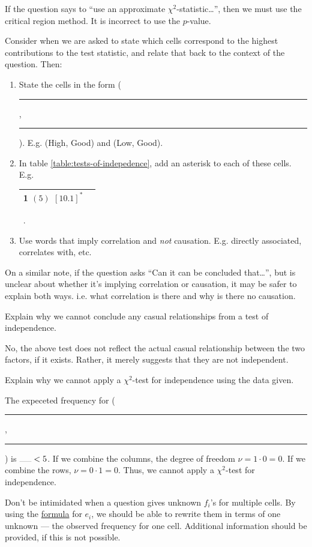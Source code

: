 \documentclass[../Notes.tex]{subfiles}
\begin{document}
\begin{note}
  If the question says to ``use an approximate \(\chi^2\)-statistic\dots'', then we must use the critical region method. It is incorrect to use the \(p\)-value.
\end{note}
\begin{note}
  Consider when we are asked to state which cells correspond to the highest contributions to the test statistic, and relate that back to the context of the question. Then:
  \begin{enumerate}
    \item State the cells in the form (\rule{0.5cm}{0.05mm},\ \rule{0.5cm}{0.05mm}). E.g. (High, Good) and (Low, Good).
    \item In table \ref{table:tests-of-indepedence}, add an asterisk to each of these cells. E.g. 
    \begin{tabular}{|Sc|}
       \((5)\) \([10.1]^{*}\)\\
      \hline
    \end{tabular}\ .
    \item Use words that imply correlation and \emph{not} causation. E.g. directly associated, correlates with, etc.
  \end{enumerate}
\end{note}
\begin{note}
  On a similar note, if the question asks ``Can it can be concluded that\dots'', but is unclear about whether it's implying correlation or causation, it may be safer to explain both ways. i.e. what correlation is there and why is there no causation. 
\end{note}
\begin{note}
  Explain why we cannot conclude any casual relationships from a test of independence.
  \begin{center}
    \parbox{0.9\textwidth}{
      No, the above test does not reflect the actual casual relationship between the two factors, if it exists. Rather, it merely suggests that they are not independent.
    }
  \end{center}
\end{note}
\begin{note}
  Explain why we cannot apply a \(\chi^2\)-test for independence using the data given.
  \begin{center}
    \parbox{0.9\textwidth}{
      The expeceted frequency for (\rule{0.5cm}{0.05mm},\ \rule{0.5cm}{0.05mm}) is \(\rule{0.5cm}{0.05mm}<5\). If we combine the columns, the degree of freedom \(\nu=1\cdot 0=0\). If we combine the rows, \(\nu=0\cdot 1=0\). Thus, we cannot apply a \(\chi^2\)-test for independence. 
    }
  \end{center}
\end{note}
\begin{note}
  Don't be intimidated when a question gives unknown \(f_i\)'s for multiple cells. By using the \hyperlink{test-of-independence-expected-frequencies}{formula} for \(e_i\), we should be able to rewrite them in terms of one unknown --- the observed frequency for one cell. Additional information should be provided, if this is not possible.
\end{note}
\end{document}
